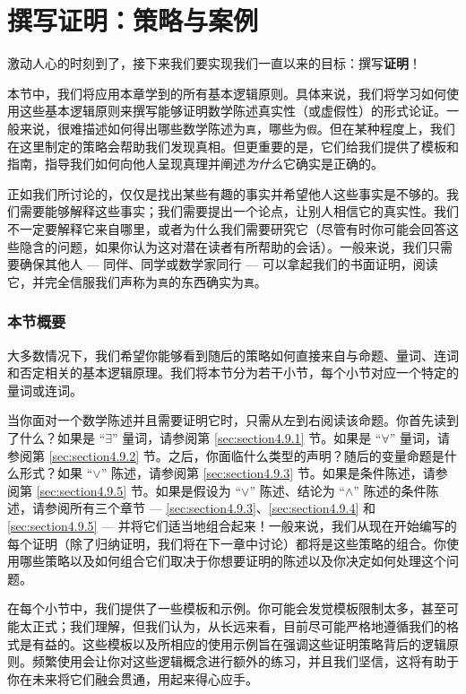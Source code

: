 \section{撰写证明：策略与案例}\label{sec:section4.9}


激动人心的时刻到了，接下来我们要实现我们一直以来的目标：撰写\textbf{证明}！

本节中，我们将应用本章学到的所有基本逻辑原则。具体来说，我们将学习如何使用这些基本逻辑原则来撰写能够证明数学陈述真实性（或虚假性）的形式论证。一般来说，很难描述如何得出哪些数学陈述为\verb|真|，哪些为\verb|假|。但在某种程度上，我们在这里制定的策略会帮助我们发现真相。但更重要的是，它们给我们提供了模板和指南，指导我们如何向他人呈现真理并阐述\emph{为什么}它确实是正确的。

正如我们所讨论的，仅仅是找出某些有趣的事实并希望他人这些事实是不够的。我们需要能够解释这些事实；我们需要提出一个论点，让别人相信它的真实性。我们不一定要解释它来自哪里，或者为什么我们需要研究它（尽管有时你可能会回答这些隐含的问题，如果你认为这对潜在读者有所帮助的会话）。一般来说，我们只需要确保其他人 --- 同伴、同学或数学家同行 --- 可以拿起我们的书面证明，阅读它，并完全信服我们声称为\verb|真|的东西确实为\verb|真|。

\subsubsection*{本节概要}

大多数情况下，我们希望你能够看到随后的策略如何直接来自与命题、量词、连词和否定相关的基本逻辑原理。我们将本节分为若干小节，每个小节对应一个特定的量词或连词。

当你面对一个数学陈述并且需要证明它时，只需从左到右阅读该命题。你首先读到了什么？如果是 ``$\exists$'' 量词，请参阅第 \ref{sec:section4.9.1} 节。如果是 ``$\forall$'' 量词，请参阅第 \ref{sec:section4.9.2} 节。之后，你面临什么类型的声明？随后的变量命题是什么形式？如果 ``$\lor$'' 陈述，请参阅第 \ref{sec:section4.9.3} 节。如果是条件陈述，请参阅第 \ref{sec:section4.9.5} 节。如果是假设为 ``$\lor$'' 陈述、结论为 ``$\land$'' 陈述的条件陈述，请参阅所有三个章节 --- \ref{sec:section4.9.3}、\ref{sec:section4.9.4} 和 \ref{sec:section4.9.5} --- 并将它们适当地组合起来！一般来说，我们从现在开始编写的每个证明（除了归纳证明，我们将在下一章中讨论）都将是这些策略的组合。你使用哪些策略以及如何组合它们取决于你想要证明的陈述以及你决定如何处理这个问题。

在每个小节中，我们提供了一些模板和示例。你可能会发觉模板限制太多，甚至可能太正式；我们理解，但我们认为，从长远来看，目前尽可能严格地遵循我们的格式是有益的。这些模板以及所相应的使用示例旨在强调这些证明策略背后的逻辑原则。频繁使用会让你对这些逻辑概念进行额外的练习，并且我们坚信，这将有助于你在未来将它们融会贯通，用起来得心应手。

